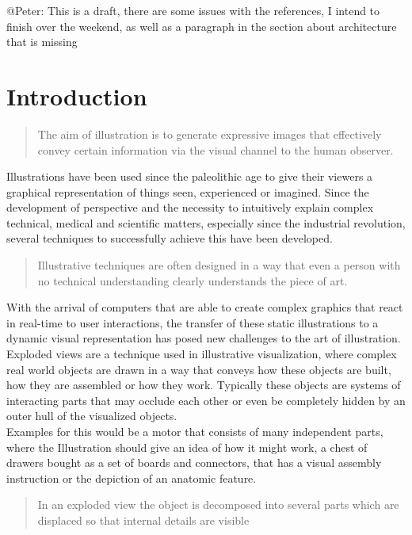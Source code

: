@Peter: This is a draft, there are some issues with the references,  I intend to finish over the weekend, as well as a paragraph in the section about architecture that is missing

\chapter{Introduction}

\begin{quote}
The aim of illustration is to generate expressive images that effectively convey certain information via the visual channel to the human observer.\cite{Viola:2005:SVV:2381219.2381249}
\end{quote}

Illustrations have been used since the paleolithic age\cite{Viola:2005:SVV:2381219.2381249} to give their viewers a graphical representation of things seen, experienced or imagined. Since the development of perspective and the necessity to intuitively explain complex technical, medical and scientific matters, especially since the industrial revolution, several techniques to successfully achieve this have been developed.
\begin{quote}
Illustrative techniques are often designed in a way that even a person with no technical understanding clearly understands the piece of art.\cite{Viola:2005:SVV:2381219.2381249}
\end{quote}
With the arrival of computers that are able to create complex graphics that react in real-time to user interactions, the transfer of these static illustrations to a dynamic visual representation has posed new challenges to the art of illustration.
Exploded views are a technique used in illustrative visualization, where complex real world objects are drawn in a way that conveys how these objects are built, how they are assembled or how they work. Typically these objects are systems of interacting parts that may occlude each other or even be completely hidden by an outer hull of the visualized objects.\\
Examples for this would be a motor that consists of many independent parts, where the Illustration should give an idea of how it might work, a chest of drawers bought as a set of boards and connectors, that has a visual assembly instruction or the depiction of an anatomic feature.\\
\begin{quote}
In an exploded view the object is decomposed into several parts which are displaced so that internal details are visible \cite{proc:bruckner-2006-EVV}
\end{quote}
